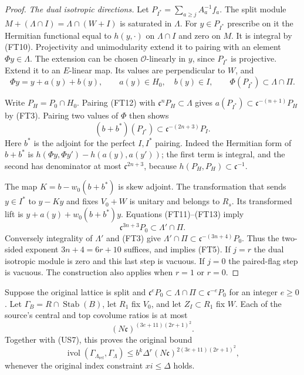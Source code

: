 \begin{proof}
\smallskip\noindent\emph{The dual isotropic directions.}
Let $P_{I^*}=\sum_{a\geq j}A_a^{-1}f_a$.
The split module
$M+(\Lambda\cap I)=\Lambda\cap(W+I)$ is saturated
in $\Lambda$.  For $y\in P_{I^*}$ prescribe on it the
Hermitian functional equal to $h(y,\cdot)$ on
$\Lambda\cap I$ and zero on $M$.
It is integral by (FT10).  Projectivity and unimodularity
extend it to pairing with an element $\Phi y\in\Lambda$.
The extension can be chosen $\mathcal O$-linearly in $y$,
since $P_{I^*}$ is projective.  Extend it to an $E$-linear
map.  Its values are perpendicular to $W$, and
\[
       \Phi y=y+a(y)+b(y),\qquad
       a(y)\in H_0,\quad b(y)\in I,
       \qquad\Phi(P_{I^*})\subset\Lambda\cap\Pi.
 \tag{FT12}
\]

Write $P_H=P_0\cap H_0$.  Pairing (FT12) with
$\mathfrak c^nP_H\subset\Lambda$ gives
$a(P_{I^*})\subset\mathfrak c^{-(n+1)}P_H$ by (FT3).
Pairing two values of $\Phi$ then shows
\[
        (b+b^*)(P_{I^*})\subset\mathfrak c^{-(2n+3)}P_I.
 \tag{FT13}
\]
Here $b^*$ is the adjoint for the perfect $I,I^*$ pairing.
Indeed the Hermitian form of $b+b^*$ is
$h(\Phi y,\Phi y')-h(a(y),a(y'))$; the first term is
integral, and the second has denominator at most
$\mathfrak c^{2n+3}$, because
$h(P_H,P_H)\subset\mathfrak c^{-1}$.

The map $K=b-w_0(b+b^*)$ is skew adjoint.  The
transformation that sends $y\in I^*$ to $y-Ky$ and
fixes $V_0+W$ is unitary and belongs to $R_s$.
Its transformed lift is
$y+a(y)+w_0(b+b^*)y$.  Equations (FT11)--(FT13) imply
\[
       \mathfrak c^{3n+3}P_0\subset\Lambda'\cap\Pi.
\]
Conversely integrality of $\Lambda'$ and (FT3) give
$\Lambda'\cap\Pi\subset\mathfrak c^{-(3n+4)}P_0$.
Thus the two-sided exponent $3n+4=6r+10$ suffices, and
implies (FT5).  If $j=r$ the dual isotropic module is
zero and this last step is vacuous.  If $j=0$ the
paired-flag step is vacuous.  The construction also
applies when $r=1$ or $r=0$.
\end{proof}

\begin{theorem}
\label{thm:flag-small-stabilizer-quotients}
Suppose the original lattice is split and
$\mathfrak c^eP_0\subset\Lambda\cap\Pi
\subset\mathfrak c^{-e}P_0$ for an integer $e\geq0$.
Let $\Gamma_B=R\cap\operatorname{Stab}(B)$, let $R_1$
fix $V_0$, and let $Z_I\subset R_1$ fix $W$.
Each of the source's central and top covolume ratios
is at most
\[
                     (N\mathfrak c)^{(3e+11)(2r+1)^2}.
 \tag{FT14}
\]
Together with (US7), this proves the original bound
\[
 \operatorname{ivol}(\Gamma_{\Lambda_{\mathrm{ref}}},\Gamma_\Lambda)
 \leq b^k\Delta^r
                  (N\mathfrak c)^{2(3e+11)(2r+1)^2},
 \tag{FT15}
\]
whenever the original index constraint $xi\leq\Delta$
holds.
\end{theorem}

